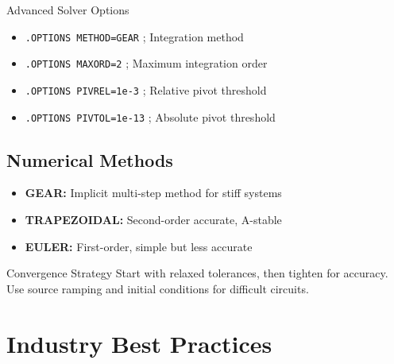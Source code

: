 \documentclass{beamer}
\begin{document}
\begin{frame}{Advanced Solver Options}
    \begin{itemize}
        \item \texttt{.OPTIONS METHOD=GEAR} ; Integration method
        \item \texttt{.OPTIONS MAXORD=2} ; Maximum integration order
        \item \texttt{.OPTIONS PIVREL=1e-3} ; Relative pivot threshold
        \item \texttt{.OPTIONS PIVTOL=1e-13} ; Absolute pivot threshold
    \end{itemize}
    
    \subsection{Numerical Methods}
    \begin{itemize}
        \item \textbf{GEAR:} Implicit multi-step method for stiff systems
        \item \textbf{TRAPEZOIDAL:} Second-order accurate, A-stable
        \item \textbf{EULER:} First-order, simple but less accurate
    \end{itemize}
    
    \begin{exampleblock}{Convergence Strategy}
        Start with relaxed tolerances, then tighten for accuracy. Use source ramping and initial conditions for difficult circuits.
    \end{exampleblock}
\end{frame}

\section{Industry Best Practices}
\end{document}
